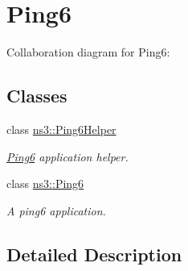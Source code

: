 \hypertarget{group__ping6}{}\section{Ping6}
\label{group__ping6}
Collaboration diagram for Ping6\+:
\subsection*{Classes}
\begin{DoxyCompactItemize}
\item 
class \hyperlink{classns3_1_1Ping6Helper}{ns3\+::\+Ping6\+Helper}
\begin{DoxyCompactList}\small\item\em \hyperlink{classns3_1_1Ping6}{Ping6} application helper. \end{DoxyCompactList}\item 
class \hyperlink{classns3_1_1Ping6}{ns3\+::\+Ping6}
\begin{DoxyCompactList}\small\item\em A ping6 application. \end{DoxyCompactList}\end{DoxyCompactItemize}


\subsection{Detailed Description}
